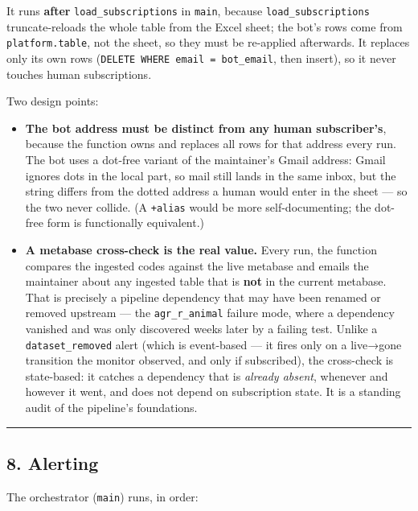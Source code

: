 \documentclass[
]{article}
\providecommand{\tightlist}{%
  \setlength{\itemsep}{0pt}\setlength{\parskip}{0pt}}
\begin{document}
It runs \textbf{after} \texttt{load\_subscriptions} in \texttt{main},
because \texttt{load\_subscriptions} truncate-reloads the whole table
from the Excel sheet; the bot's rows come from \texttt{platform.table},
not the sheet, so they must be re-applied afterwards. It replaces only
its own rows (\texttt{DELETE\ WHERE\ email\ =\ bot\_email}, then
insert), so it never touches human subscriptions.

Two design points:

\begin{itemize}
\tightlist
\item
  \textbf{The bot address must be distinct from any human subscriber's},
  because the function owns and replaces all rows for that address every
  run. The bot uses a dot-free variant of the maintainer's Gmail
  address: Gmail ignores dots in the local part, so mail still lands in
  the same inbox, but the string differs from the dotted address a human
  would enter in the sheet --- so the two never collide. (A
  \texttt{+alias} would be more self-documenting; the dot-free form is
  functionally equivalent.)
\item
  \textbf{A metabase cross-check is the real value.} Every run, the
  function compares the ingested codes against the live metabase and
  emails the maintainer about any ingested table that is \textbf{not} in
  the current metabase. That is precisely a pipeline dependency that may
  have been renamed or removed upstream --- the \texttt{agr\_r\_animal}
  failure mode, where a dependency vanished and was only discovered
  weeks later by a failing test. Unlike a \texttt{dataset\_removed}
  alert (which is event-based --- it fires only on a live→gone
  transition the monitor observed, and only if subscribed), the
  cross-check is state-based: it catches a dependency that is
  \emph{already absent}, whenever and however it went, and does not
  depend on subscription state. It is a standing audit of the pipeline's
  foundations.
\end{itemize}

\begin{center}\rule{0.5\linewidth}{0.5pt}\end{center}

\subsection{8. Alerting}\label{alerting}

The orchestrator (\texttt{main}) runs, in order:
\end{document}
